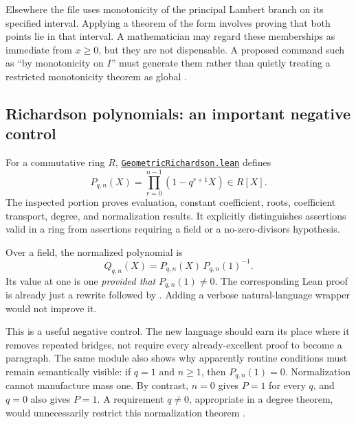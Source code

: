 \documentclass[11pt,a4paper]{article}
\newcommand{\code}[1]{\texttt{\detokenize{#1}}}
\newcommand{\pfile}[1]{\href{https://github.com/VladimirReshetnikov/ProveIt/blob/24ce8bd743eaab64a91ce90725ea00f498d319d2/Analysis/FabiusFunction/Lean/FabiusFunction/#1}{\nolinkurl{#1}}}
\theoremstyle{remark}
\begin{document}
Elsewhere the file uses monotonicity of the principal Lambert branch on its specified interval. Applying a theorem of the form \code{StrictMonoOn} involves proving that both points lie in that interval. A mathematician may regard these memberships as immediate from $x\geq0$, but they are not dispensable. A proposed command such as ``by monotonicity on $I$'' must generate them rather than quietly treating a restricted monotonicity theorem as global \cite{proveit}.

\subsection{Richardson polynomials: an important negative control}
For a commutative ring $R$, \pfile{GeometricRichardson.lean} defines
\begin{equation}
P_{q,n}(X)=\prod_{r=0}^{n-1}(1-q^{r+1}X)\in R[X].
\label{eq:geometric-poly}
\end{equation}
The inspected portion proves evaluation, constant coefficient, roots, coefficient transport, degree, and normalization results. It explicitly distinguishes assertions valid in a ring from assertions requiring a field or a no-zero-divisors hypothesis.

Over a field, the normalized polynomial is
\begin{equation}
Q_{q,n}(X)=P_{q,n}(X)\,P_{q,n}(1)^{-1}.
\label{eq:normalized-poly}
\end{equation}
Its value at one is one \emph{provided that} $P_{q,n}(1)\ne0$. The corresponding Lean proof is already just a rewrite followed by \code{div_self hden}. Adding a verbose natural-language wrapper would not improve it.

This is a useful negative control. The new language should earn its place where it removes repeated bridges, not require every already-excellent proof to become a paragraph. The same module also shows why apparently routine conditions must remain semantically visible: if $q=1$ and $n\geq1$, then $P_{q,n}(1)=0$. Normalization cannot manufacture mass one. By contrast, $n=0$ gives $P=1$ for every $q$, and $q=0$ also gives $P=1$. A requirement $q\ne0$, appropriate in a degree theorem, would unnecessarily restrict this normalization theorem \cite{proveit}.
\end{document}
